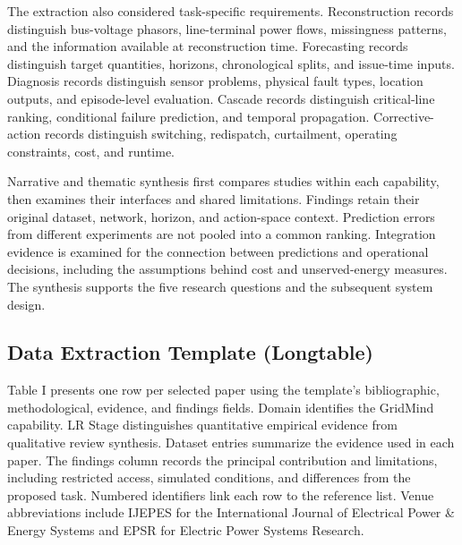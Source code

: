 \documentclass[journal,letterpaper]{IEEEtran}
\begin{document}
The extraction also considered task-specific requirements. Reconstruction records distinguish bus-voltage phasors, line-terminal power flows, missingness patterns, and the information available at reconstruction time. Forecasting records distinguish target quantities, horizons, chronological splits, and issue-time inputs. Diagnosis records distinguish sensor problems, physical fault types, location outputs, and episode-level evaluation. Cascade records distinguish critical-line ranking, conditional failure prediction, and temporal propagation. Corrective-action records distinguish switching, redispatch, curtailment, operating constraints, cost, and runtime.

Narrative and thematic synthesis first compares studies within each capability, then examines their interfaces and shared limitations. Findings retain their original dataset, network, horizon, and action-space context. Prediction errors from different experiments are not pooled into a common ranking. Integration evidence is examined for the connection between predictions and operational decisions, including the assumptions behind cost and unserved-energy measures. The synthesis supports the five research questions and the subsequent system design.

\subsection{Data Extraction Template (Longtable)}
Table I presents one row per selected paper using the template's bibliographic, methodological, evidence, and findings fields. Domain identifies the GridMind capability. LR Stage distinguishes quantitative empirical evidence from qualitative review synthesis. Dataset entries summarize the evidence used in each paper. The findings column records the principal contribution and limitations, including restricted access, simulated conditions, and differences from the proposed task. Numbered identifiers link each row to the reference list. Venue abbreviations include IJEPES for the International Journal of Electrical Power \& Energy Systems and EPSR for Electric Power Systems Research.

\clearpage
\onecolumn\twocolumn
\end{document}
